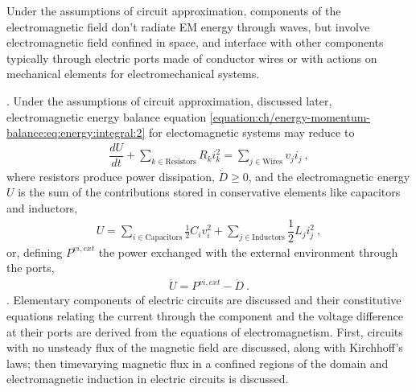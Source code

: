 \documentclass[letterpaper,10pt,english]{jupyterBook}
\begin{document}
\sphinxAtStartPar
Under the assumptions of circuit approximation, components of the electromagnetic field don’t radiate EM energy through waves, but involve electromagnetic field confined in space, and interface with other components typically through electric ports made of conductor wires \sphinxhyphen{} or with actions on mechanical elements for electro\sphinxhyphen{}mechanical systems.

\sphinxAtStartPar
{\hyperref[\detokenize{ch/circuits-energy:classical-electromagnetism-circuits-energy}]{}}. Under the assumptions of circuit approximation, discussed later, electromagnetic energy balance equation \eqref{equation:ch/energy-momentum-balance:eq:energy:integral:2} for electomagnetic systems may reduce to
\begin{equation*}
\begin{split}\dfrac{d U}{dt} + \sum_{k \in \text{Resistors}} R_k i_k^2 = \sum_{j \in \text{Wires}} v_j i_j \ ,\end{split}
\end{equation*}
\sphinxAtStartPar
where resistors produce power dissipation, \(\dot{D} \ge 0\), and the electromagnetic energy \(U\) is the sum of the contributions stored in conservative elements like capacitors and inductors,
\begin{equation*}
\begin{split}U = \sum_{i \in \text{Capacitors}} \frac{1}{2} C_i v_i^2 + \sum_{j \in \text{Inductors}} \dfrac{1}{2} L_j i_j^2 \ ,\end{split}
\end{equation*}
\sphinxAtStartPar
or, defining \(P^{vi, ext}\) the power exchanged with the external environment through the ports,
\begin{equation*}
\begin{split}\dot{U} = P^{vi, ext} - \dot{D} \ .\end{split}
\end{equation*}
\sphinxAtStartPar
{\hyperref[\detokenize{ch/circuits-electric:classical-electromagnetism-circuits-electric}]{}}. Elementary components of electric circuits are discussed and their constitutive equations relating the current through the component and the voltage difference at their ports are derived from the equations of electromagnetism. First, circuits with no unsteady flux of the magnetic field are discussed, along with Kirchhoff’s laws; then time\sphinxhyphen{}varying magnetic flux in a confined regions of the domain and electromagnetic induction in electric circuits is discussed.
\end{document}
